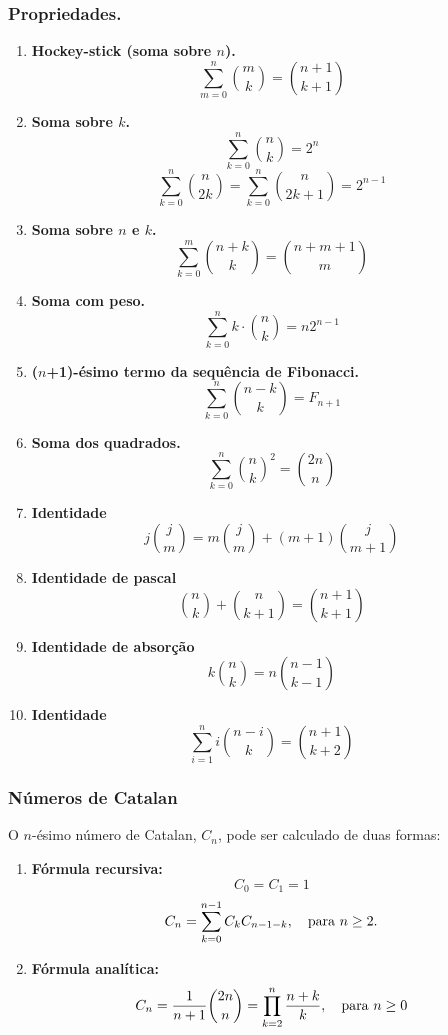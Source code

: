 \subsubsection*{Propriedades.}
\begin{multicols}{2}
    \begin{enumerate}
        \item \textbf{Hockey-stick (soma sobre $n$).}
        $$\sum_{m = 0}^{n} \binom{m}{k} = \binom{n+1}{k+1}$$

        \item \textbf{Soma sobre $k$.}
        $$\sum_{k = 0}^{n} \binom{n}{k} = 2^n$$
        $$\sum_{k = 0}^{n} \binom{n}{2k} = \sum_{k = 0}^{n} \binom{n}{2k+1} = 2^{n-1}$$

        \item \textbf{Soma sobre $n$ e $k$.}
        $$\sum_{k=0}^{m} \binom{n+k}{k} = \binom{n+m+1}{m}$$

        \item \textbf{Soma com peso.}
        $$\sum_{k=0}^{n} k\cdot \binom{n}{k} = n2^{n-1}$$

        \item \textbf{($n$+1)-ésimo termo da sequência de Fibonacci.}
        $$\sum_{k = 0}^{n} \binom{n-k}{k} = F_{n+1}$$

        \item \textbf{Soma dos quadrados.}
        $$\sum_{k = 0}^{n} \binom{n}{k}^2 = \binom{2n}{n}$$

  		\item \textbf{Identidade}
  		$$j \binom{j}{m} = m \binom{j}{m} + (m+1) \binom{j}{m+1}$$

 		\item \textbf{Identidade de pascal}
   		$$\binom{n}{k} + \binom{n}{k+1} = \binom{n+1}{k+1}$$

		\item \textbf{Identidade de absorção}
   		$$k \binom{n}{k} = n \binom{n-1}{k-1}$$

  		\item \textbf{Identidade}
		$$\sum_{i=1}^{n} i \binom{n-i}{k} = \binom{n+1}{k+2}$$
  		
    \end{enumerate}
\end{multicols}
 
\subsubsection{Números de Catalan}
O $n$-ésimo número de Catalan, $C_n$, pode ser calculado de duas formas:
\begin{enumerate}
    \item \textbf{Fórmula recursiva:} 
    $$C_0 = C_1 = 1$$
    $$C_n = \sum_{k = 0}^{n-1}C_kC_{n-1-k}, \quad \textnormal{para } n \ge 2.$$

    \item \textbf{Fórmula analítica:}
    $$C_n = \frac{1}{n+1} \binom{2n}{n} = \prod_{k=2}^{n} \frac{n+k}{k}, \quad \textnormal{para } n \ge 0$$
\end{enumerate}

